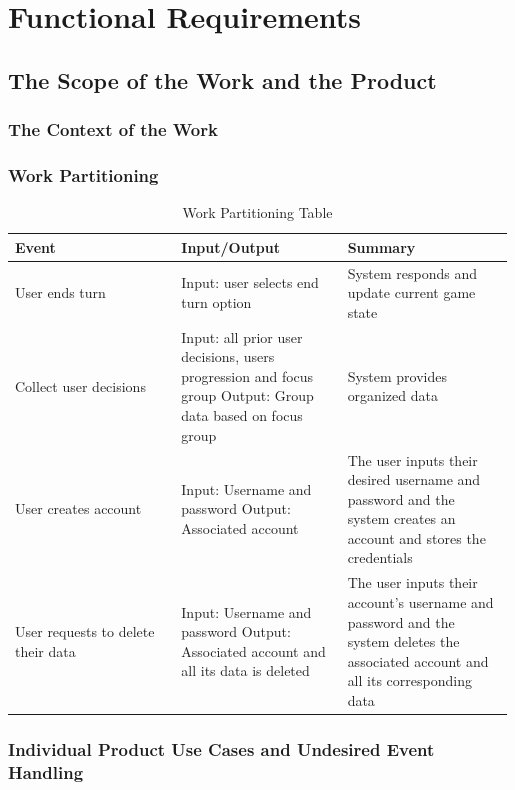 \documentclass{article}
\begin{document}
\section{Functional Requirements}

\subsection{The Scope of the Work and the Product}

\subsubsection{The Context of the Work}


\subsubsection{Work Partitioning}
\begin{table}[h]
    \centering
    \begin{tabular}{|p{0.33\linewidth} | p{0.33\linewidth} | p{0.33\linewidth}| }
    \hline
         Event & Input/Output & Summary \\
         \hline
         User ends turn & Input: user selects end turn option & System responds and update current game state\\
         \hline 
         Collect user decisions & Input: all prior user decisions, users progression and focus group \newline Output: Group data based on focus group  & System provides organized data \\
         \hline 
          User creates account & Input: Username and password \newline Output: Associated account & The user inputs their desired username and password and the system creates an account and stores the credentials\\
         \hline 
         User requests to delete their data & Input: Username and password \newline Output: Associated account and all its data is deleted & The user inputs their account's username and password and the system deletes the associated account and all its corresponding data\\
         \hline 
    \end{tabular}
    \caption{Work Partitioning Table}
    \label{tab:my_label}
\end{table}
\newpage

\subsubsection{Individual Product Use Cases and Undesired Event Handling}
\end{document}
